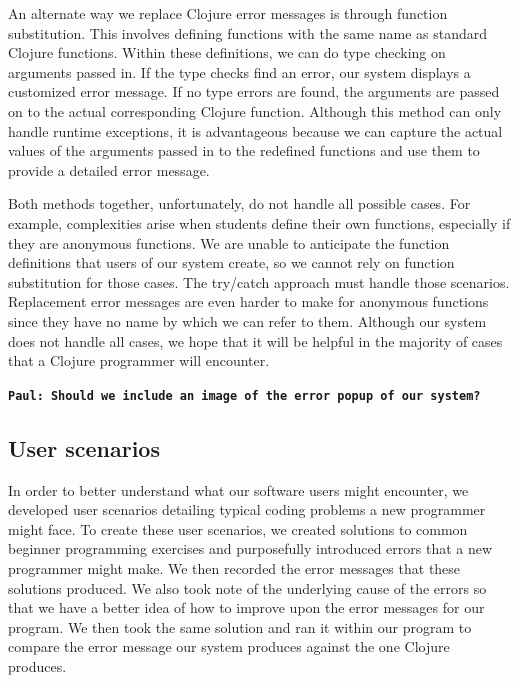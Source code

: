 \documentclass[12pt]{article}
\newcommand{\comment}[1]{{\bf \tt  {#1}}}
\newcommand{\emcomment}[1]{\textcolor{ForestGreen}{\comment{Elena: {#1}}}}
\newcommand{\pscomment}[1]{\textcolor{Coquelicot}{\comment{Paul: {#1}}}}
\newcommand{\alcomment}[1]{\textcolor{red}{\comment{Lemmon: {#1}}}}
\begin{document}

An alternate way we replace Clojure error messages is through function substitution.
This involves defining functions with the same name as standard Clojure functions.
Within these definitions, we can do type checking on arguments passed in.
If the type checks find an error, our system displays a customized error message.
If no type errors are found, the arguments are passed on to the actual corresponding Clojure function.
Although this method can only handle runtime exceptions, it is advantageous because we can capture the actual values of the arguments passed in to the redefined functions and use them to provide a detailed error message.

Both methods together, unfortunately, do not handle all possible cases.
For example, complexities arise when students define their own functions, especially if they are anonymous functions.
We are unable to anticipate the function definitions that users of our system create, so we cannot rely on function substitution for those cases.
The try/catch approach must handle those scenarios.
Replacement error messages are even harder to make for anonymous functions since they have no name by which we can refer to them.
Although our system does not handle all cases, we hope that it will be helpful in the majority of cases that a Clojure programmer will encounter.


\pscomment{Should we include an image of the error popup of our system?}

\subsection{User scenarios}\label{sec:scenarios}

In order to better understand what our software users might encounter, we developed user scenarios detailing typical coding problems a new programmer might face.
To create these user scenarios, we created solutions to common beginner programming exercises and purposefully introduced errors that a new programmer might make.
We then recorded the error messages that these solutions produced.
We also took note of the underlying cause of the errors so that we have a better idea of how to improve upon the error messages for our program.
We then took the same solution and ran it within our program to compare the error message our system produces against the one Clojure produces.
\end{document}
